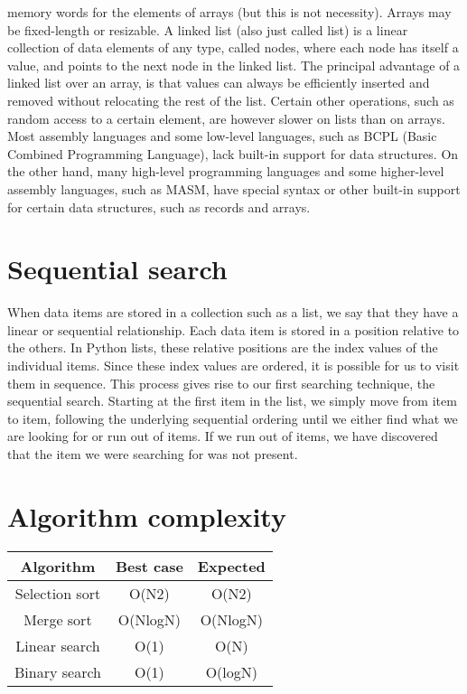 \documentclass{article}
\begin{document}
memory words for the elements of arrays (but this is
not necessity). Arrays may be fixed-length or
resizable. A linked list (also just called list) is a linear
collection of data elements of any type, called nodes,
where each node has itself a value, and points to the
next node in the linked list. The principal advantage
of a linked list over an array, is that values can always
be efficiently inserted and removed without relocating
the rest of the list. Certain other operations, such as
random access to a certain element, are however
slower on lists than on arrays. Most assembly languages and some low-level languages, such as
BCPL (Basic Combined Programming Language),
lack built-in support for data structures. On the other
hand, many high-level programming languages and
some higher-level assembly languages, such as
MASM, have special syntax or other built-in support
for certain data structures, such as records and arrays.
\section{Sequential search}
When data items are stored in a collection such as a
list, we say that they have a linear or sequential
relationship. Each data item is stored in a position
relative to the others. In Python lists, these relative
positions are the index values of the individual items.
Since these index values are ordered, it is possible for
us to visit them in sequence. This process gives rise to
our first searching technique, the sequential search.
Starting at the first item in the list, we simply move
from item to item, following the underlying sequential
ordering until we either find what we are looking for
or run out of items. If we run out of items, we have
discovered that the item we were searching for was
not present. 
\section{Algorithm complexity}
\begin{center}
\begin{tabular}{|c|c|c|}
      
    \hline
     Algorithm &Best case    &  Expected\\
     \hline
      Selection sort   & O(N2) & O(N2)\\
      \hline
      Merge sort& O(NlogN)& O(NlogN)\\
      \hline
      Linear search & O(1)& O(N)\\
      \hline
      Binary search& O(1) & O(logN)\\
      \hline  
    \end{tabular}
\end{center}
\end{document}
